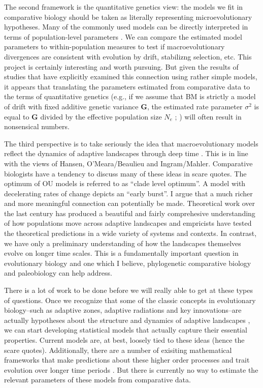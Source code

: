 The second framework is the quantitative genetics view: the models we fit in comparative biology should be taken as literally representing microevolutionary hypotheses. Many of the commonly used models can be directly interpreted in terms of population-level parameters \citep{HansenMartins1996, PennellHarmon}. We can compare the estimated model parameters to within-population measures to test if macroevolutionary divergences are consistent with evolution by drift, stabilizng selection, etc. This project is certainly interesting and worth pursuing. But given the results of studies that have explicitly examined this connection \citep{Lynch1990, EstesArnold2007, Hohenlohe2008, Harmon2010, Bolstad2014} using rather simple models, it appears that translating the parameters estimated from comparative data to the terms of quantitative genetics (e.g., if we assume that BM is strictly a model of drift with fixed additive genetic variance $\mathbf{G}$, the estimated rate parameter $\sigma^2$ is equal to $\mathbf{G}$ divided by the effective population size $N_e$ ; \citealt{Lande1976}) will often result in nonsensical numbers. 

The third perspective is to take seriously the idea that macroevolutionary models reflect the dynamics of adaptive landscapes through deep time \citep{Arnoldetal2001, Hansen2012book, PennellPE}. This is in line with the views of Hansen, O'Meara/Beaulieu and Ingram/Mahler.  Comparative biologists have a tendency to discuss many of these ideas in scare quotes. The optimum of OU models is referred to as ``clade level optimum''. A model with decelerating rates of change depicts an ``early burst''. I argue that a much richer and more meaningful connection can potentially be made. Theoretical work over the last century has produced a beautiful and fairly comprehesive understanding of how populations move across adaptive landscapes and empricists have tested the theoretical predictions in a wide variety of systems and contexts. In contrast, we have only a preliminary understanding of how the landscapes themselves evolve on longer time scales. This is a fundamentally important question in evolutionary biology and one which I believe, phylogenetic comparative biology and paleobiology can help address. 

There is a lot of work to be done before we will really able to get at these types of questions. Once we recognize that some of the classic concepts in evolutionary biology--such as adaptive zones, adaptive radiations and key innovations--are actually hypotheses about the structure and dynamics of adaptive landscapes \citep{Hansen2012book}, we can start developing statistical models that actually capture their essential properties. Current models are, at best, loosely tied to these ideas (hence the scare quotes). Additionally, there are a number of exisiting mathematical frameworks that make predictions about these higher order processes and trait evolution over longer time periods \citep[see for example,][]{Holt2003, Gavrilets2004, Doebeli2011}. But there is currently no way to estimate the relevant parameters of these models from comparative data.  


